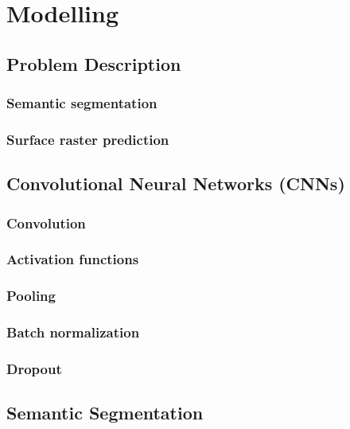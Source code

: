 \chapter{Modelling}

\section{Problem Description}%
\label{sec:segmentation-description}
\subsection{Semantic segmentation}

\subsection{Surface raster prediction}


\section{Convolutional Neural Networks (CNNs)}%
\label{sec:cnn}

\subsection{Convolution}

\subsection{Activation functions}

\subsection{Pooling}

\subsection{Batch normalization}

\subsection{Dropout}



\section{Semantic Segmentation}

